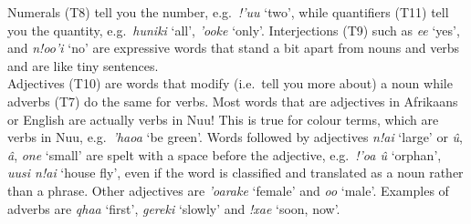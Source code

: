 Numerals (T8) tell you the number, e.g.\ \emph{!'uu} `two', while
quantifiers (T11) tell you the quantity, e.g.\ \emph{huniki} `all',
\emph{\textipa{\textdoublevertline}'ooke} `only'. Interjections (T9)
such as \emph{ee} `yes', and \emph{n!oo'i} `no' are expressive words
that stand a bit apart from nouns and verbs and are like tiny
sentences.\\

Adjectives (T10) are words that modify (i.e.\ tell you more about) a
noun while adverbs (T7) do the same for verbs. Most words that are
adjectives in Afrikaans or English are actually verbs in
N\textipa{\textvertline}uu! This is true for colour terms, which are
verbs in N\textipa{\textvertline}uu, e.g.\
\emph{\textipa{\textdoublevertline}'haoa} `be green'. Words followed
by adjectives \emph{n!ai} `large' or \emph{\^{u}},
\emph{\textipa{\!o}\^{a}}, \emph{one} `small' are spelt
with a space before the adjective, e.g.\ \emph{!'oa
\textipa{\!o}\^{u}} `orphan', \emph{\textipa{\textdoublebarpipe}uusi
n!ai} `house fly', even if the word is classified and translated as a
noun rather than a phrase. Other adjectives are
\emph{\textipa{\textdoublevertline}'oarake} `female' and
\emph{\textipa{\textdoublebarpipe}oo} `male'. Examples of adverbs are
\emph{\textipa{\textdoublevertline}qhaa} `first', \emph{gereki}
`slowly' and \emph{!xae} `soon, now'.\\


\pagebreak

